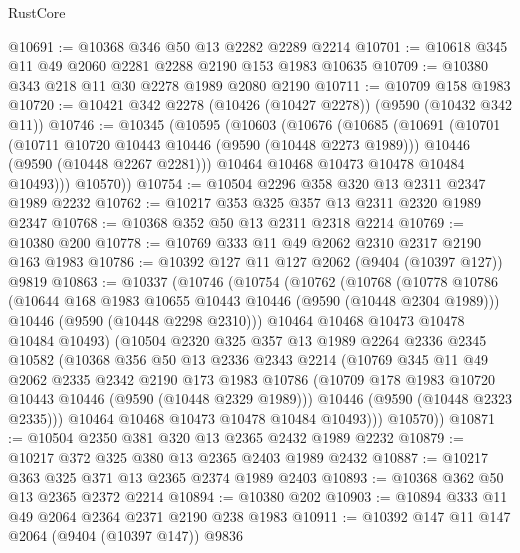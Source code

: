 \begin{lexlean}{RustCore}
\begin{coremodule}
@10691 := @10368 @346 @50 @13 @2282 @2289 @2214
@10701 := @10618 @345 @11 @49 @2060 @2281 @2288 @2190 @153 @1983 @10635
@10709 := @10380 @343 @218 @11 @30 @2278 @1989 @2080 @2190
@10711 := @10709 @158 @1983
@10720 := @10421 @342 @2278 (@10426 (@10427 @2278)) (@9590 (@10432 @342 @11))
@10746 := @10345
    (@10595
      (@10603
        (@10676
          (@10685
            (@10691
              (@10701
                (@10711 @10720 @10443 @10446 (@9590 (@10448 @2273 @1989)))
                @10446
                (@9590 (@10448 @2267 @2281)))
              @10464
              @10468
              @10473
              @10478
              @10484
              @10493)))
        @10570))
@10754 := @10504 @2296 @358 @320 @13 @2311 @2347 @1989 @2232
@10762 := @10217 @353 @325 @357 @13 @2311 @2320 @1989 @2347
@10768 := @10368 @352 @50 @13 @2311 @2318 @2214
@10769 := @10380 @200
@10778 := @10769 @333 @11 @49 @2062 @2310 @2317 @2190 @163 @1983
@10786 := @10392 @127 @11 @127 @2062 (@9404 (@10397 @127)) @9819
@10863 := @10337
    (@10746
      (@10754
        (@10762
          (@10768
            (@10778
              @10786
              (@10644 @168 @1983 @10655 @10443 @10446 (@9590 (@10448 @2304 @1989)))
              @10446
              (@9590 (@10448 @2298 @2310)))
            @10464
            @10468
            @10473
            @10478
            @10484
            @10493)
          (@10504
            @2320
            @325
            @357
            @13
            @1989
            @2264
            @2336
            @2345
            @10582
            (@10368
              @356
              @50
              @13
              @2336
              @2343
              @2214
              (@10769
                @345
                @11
                @49
                @2062
                @2335
                @2342
                @2190
                @173
                @1983
                @10786
                (@10709 @178 @1983 @10720 @10443 @10446 (@9590 (@10448 @2329 @1989)))
                @10446
                (@9590 (@10448 @2323 @2335)))
              @10464
              @10468
              @10473
              @10478
              @10484
              @10493)))
        @10570))
@10871 := @10504 @2350 @381 @320 @13 @2365 @2432 @1989 @2232
@10879 := @10217 @372 @325 @380 @13 @2365 @2403 @1989 @2432
@10887 := @10217 @363 @325 @371 @13 @2365 @2374 @1989 @2403
@10893 := @10368 @362 @50 @13 @2365 @2372 @2214
@10894 := @10380 @202
@10903 := @10894 @333 @11 @49 @2064 @2364 @2371 @2190 @238 @1983
@10911 := @10392 @147 @11 @147 @2064 (@9404 (@10397 @147)) @9836

\end{coremodule}
\end{lexlean}
